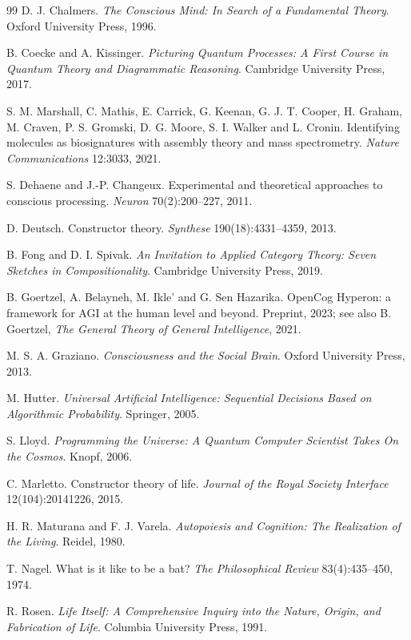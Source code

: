 \begin{thebibliography}{99}
 D. J. Chalmers. \emph{The Conscious Mind: In Search of a
Fundamental Theory}. Oxford University Press, 1996.

 B. Coecke and A. Kissinger. \emph{Picturing Quantum
Processes: A First Course in Quantum Theory and Diagrammatic Reasoning}. Cambridge
University Press, 2017.

 S. M. Marshall, C. Mathis, E. Carrick, G. Keenan, G. J. T. Cooper,
H. Graham, M. Craven, P. S. Gromski, D. G. Moore, S. I. Walker and L. Cronin.
Identifying molecules as biosignatures with assembly theory and mass spectrometry.
\emph{Nature Communications} 12:3033, 2021.

 S. Dehaene and J.-P. Changeux. Experimental and theoretical
approaches to conscious processing. \emph{Neuron} 70(2):200--227, 2011.

 D. Deutsch. Constructor theory. \emph{Synthese}
190(18):4331--4359, 2013.

 B. Fong and D. I. Spivak. \emph{An Invitation to Applied
Category Theory: Seven Sketches in Compositionality}. Cambridge University Press, 2019.

 B. Goertzel, A. Belayneh, M. Ikle' and G. Sen Hazarika. OpenCog
Hyperon: a framework for AGI at the human level and beyond. Preprint, 2023; see also
B. Goertzel, \emph{The General Theory of General Intelligence}, 2021.

 M. S. A. Graziano. \emph{Consciousness and the Social Brain}.
Oxford University Press, 2013.

 M. Hutter. \emph{Universal Artificial Intelligence: Sequential
Decisions Based on Algorithmic Probability}. Springer, 2005.

 S. Lloyd. \emph{Programming the Universe: A Quantum Computer
Scientist Takes On the Cosmos}. Knopf, 2006.

 C. Marletto. Constructor theory of life. \emph{Journal of the
Royal Society Interface} 12(104):20141226, 2015.

 H. R. Maturana and F. J. Varela. \emph{Autopoiesis and
Cognition: The Realization of the Living}. Reidel, 1980.

 T. Nagel. What is it like to be a bat? \emph{The Philosophical
Review} 83(4):435--450, 1974.

 R. Rosen. \emph{Life Itself: A Comprehensive Inquiry into the
Nature, Origin, and Fabrication of Life}. Columbia University Press, 1991.


\end{thebibliography}
